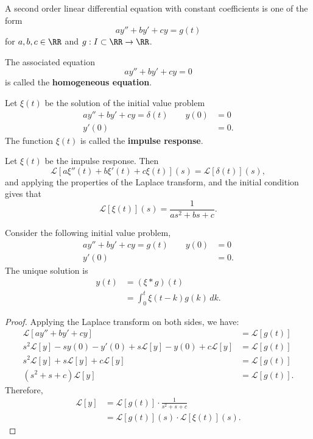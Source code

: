 \documentclass[12pt, a4paper]{article}
\newcommand{\CL}{\mathcal{L}}
\begin{document}
\begin{definition}
    A second order linear differential equation with constant coefficients is one of the form 
    \[ay''+by'+cy=g(t)\]
    for \(a,b,c \in \RR\) and \(g: I \subset \RR \to \RR\).
\end{definition}

\begin{definition}
    The associated equation 
    \[ay''+by'+cy=0\]
    is called the \textbf{homogeneous equation}.
\end{definition}

\begin{definition}
    Let \(\xi(t)\) be the solution of the initial value problem 
    \[\begin{aligned}
        ay''+by'+cy=\delta(t) \qquad y(0)&=0 \\ 
        y'(0)&=0.
    \end{aligned}\]
    The function \(\xi(t)\) is called the \textbf{impulse response}.
\end{definition}

\begin{corollary}
    Let \(\xi(t)\) be the impulse response. Then 
    \[\CL[a\xi ''(t)+b\xi '(t)+c\xi(t)](s) = \CL[\delta(t)](s),\]
    and applying the properties of the Laplace transform, and the initial condition gives that 
    \[\CL[\xi(t)](s) = \frac{1}{as^2+bs+c}.\]
\end{corollary}

\begin{mdthm}
    Consider the following initial value problem,
    \[\begin{aligned}
        ay''+by'+cy =g(t) \qquad y(0)&=0 \\
        y'(0)&=0.
    \end{aligned}\]
    The unique solution is 
    \[\begin{aligned}
        y(t) &= (\xi * g)(t) \\
        &= \int_{0}^{t} \xi(t-k)g(k) \, dk.
    \end{aligned}\]
\end{mdthm}

\begin{proof}
    Applying the Laplace transform on both sides, we have:
    \[\begin{aligned}
        \CL[ay''+by'+cy] &= \CL[g(t)] \\
        s^2\CL[y]-sy(0)-y'(0)+s\CL[y]-y(0)+c\CL[y] &= \CL[g(t)] \\
        s^2\CL[y] +s\CL[y]+c\CL[y] &= \CL[g(t)] \\
        (s^2+s+c)\CL[y] &= \CL[g(t)].
    \end{aligned}\]
    Therefore,
    \[\begin{aligned}
        \CL[y] &= \CL[g(t)] \cdot \frac{1}{s^2+s+c} \\
        &= \CL[g(t)](s) \cdot \CL[\xi(t)](s).
    \end{aligned}\]
\end{proof}
\end{document}
